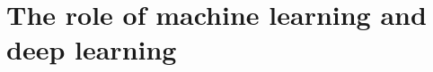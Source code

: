 
\section{The role of machine learning and deep learning}
\label{sec:processing_signals_ml_and_dl}









